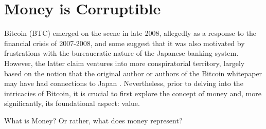 \section{Money is Corruptible}
Bitcoin (BTC) emerged on the scene in late 2008, allegedly as a response to the financial crisis of 2007-2008, and some suggest that it was also motivated
by frustrations with the bureaucratic nature of the Japanese banking system. However, the latter claim ventures into more conspiratorial territory, largely
based on the notion that the original author or authors of the Bitcoin whitepaper may have had connections to Japan \cite{nakamoto2008bitcoin}. Nevertheless,
prior to delving into the intricacies of Bitcoin, it is crucial to first explore the concept of money and, more significantly, its foundational aspect:
value.

What is Money? Or rather, what does money represent?



